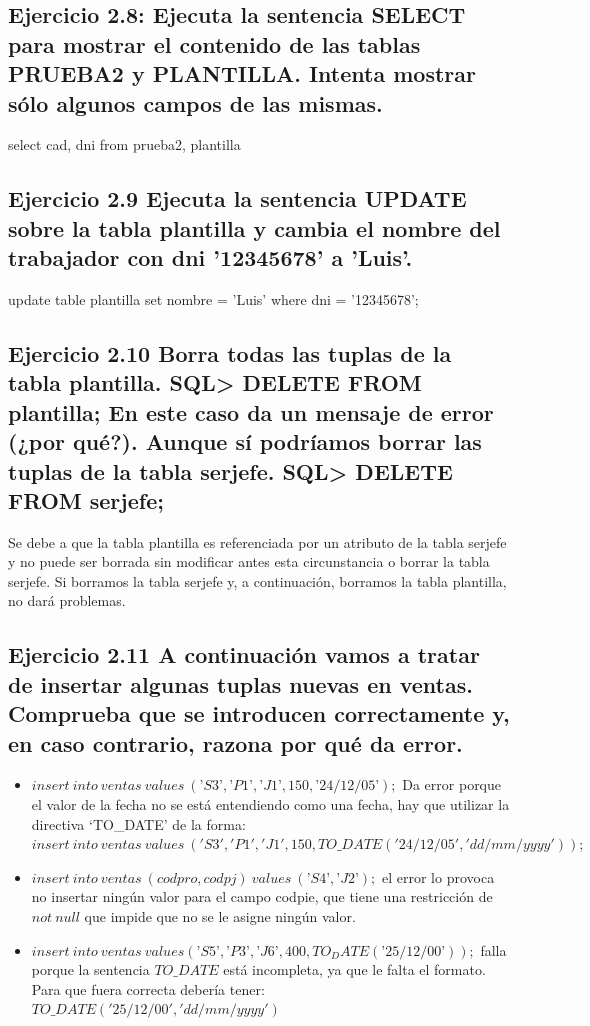 \documentclass[a4paper, 11pt]{article}
\begin{document}
\subsection{ Ejercicio 2.8: Ejecuta la sentencia SELECT para mostrar el contenido de las tablas PRUEBA2 y PLANTILLA. Intenta mostrar sólo algunos campos de las mismas.}
select cad, dni from prueba2, plantilla	
\subsection{Ejercicio 2.9 Ejecuta la sentencia UPDATE sobre la tabla plantilla y cambia el nombre del trabajador con dni ’12345678’ a ’Luis’.}
update table plantilla 
	set nombre = 'Luis' where dni = '12345678';
	
\subsection{Ejercicio 2.10 Borra todas las tuplas de la tabla plantilla.
	SQL> DELETE FROM plantilla;
	En este caso da un mensaje de error (¿por qué?). Aunque sí podríamos borrar las tuplas
	de la tabla serjefe.
	SQL> DELETE FROM serjefe;}
Se debe a que la tabla plantilla es referenciada por un atributo de la tabla serjefe y no puede ser borrada sin modificar antes esta circunstancia o borrar la tabla serjefe. Si borramos la tabla serjefe y, a continuación, borramos la tabla plantilla, no dará problemas.


\subsection{Ejercicio 2.11 A continuación vamos a tratar de insertar algunas tuplas nuevas en ventas.
	Comprueba que se introducen correctamente y, en caso contrario, razona por qué da error.}
\begin{itemize}
	\item  $insert\ into\ ventas\ values\ (’S3’, ’P1’, ’J1’, 150, ’24/12/05’);$
	Da error porque el valor de la fecha no se está entendiendo como una fecha, hay que utilizar la directiva `TO\_DATE' de la forma:
	$insert\ into\ ventas\ values\ ('S3', 'P1', 'J1', 150, TO\_DATE('24/12/05','dd/mm/yyyy'));$
	\item $insert\ into\ ventas\ (codpro, codpj)\ values\ (’S4’, ’J2’);$  el error lo provoca no insertar ningún valor para el campo codpie, que tiene una restricción de $not\ null$ que impide que no se le asigne ningún valor. 
	\item $insert\ into\ ventas\ values(’S5’,’P3’,’J6’,400,TO_DATE(’25/12/00’));$ falla porque la sentencia $TO\_DATE$ está incompleta, ya que le falta el formato. Para que fuera correcta debería tener: $TO\_DATE('25/12/00','dd/mm/yyyy')$
\end{itemize}
	
\end{document}

